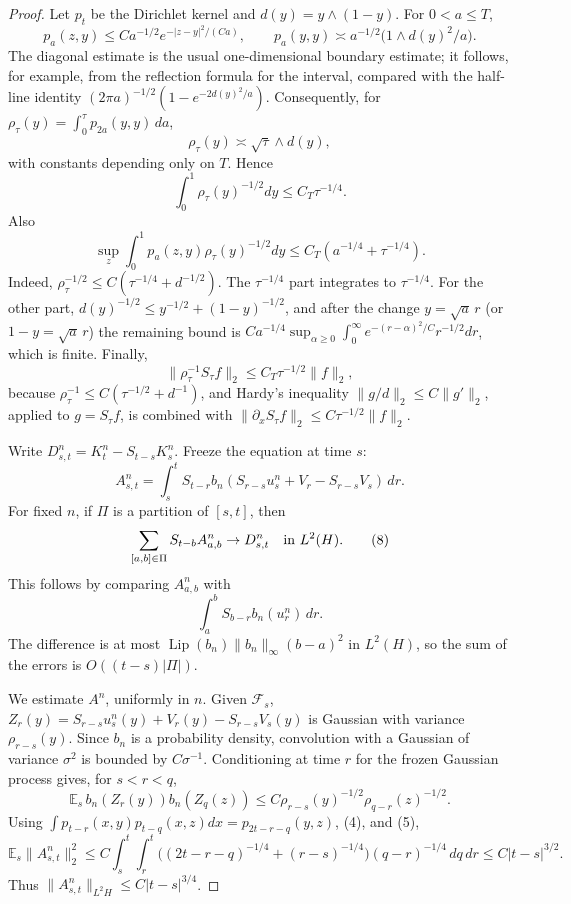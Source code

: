 \documentclass[12pt]{article}
\newcommand{\E}{\mathbb E}
\newcommand{\1}{\mathbf 1}
\newcommand{\calF}{\mathcal F}
\newcommand{\Lip}{\operatorname{Lip}}
\begin{document}
\begin{proof}
Let \(p_t\) be the Dirichlet kernel and \(d(y)=y\wedge(1-y)\).  For
\(0<a\le T\),
\[
p_a(z,y)\le Ca^{-1/2}e^{-|z-y|^2/(Ca)},\qquad
p_a(y,y)\asymp a^{-1/2}\bigl(1\wedge d(y)^2/a\bigr).
\]
The diagonal estimate is the usual one-dimensional boundary estimate; it
follows, for example, from the reflection formula for the interval, compared
with the half-line identity
\((2\pi a)^{-1/2}(1-e^{-2d(y)^2/a})\).  Consequently, for
\(\rho_\tau(y)=\int_0^\tau p_{2a}(y,y)\,da\),
\[
        \rho_\tau(y)\asymp \sqrt{\tau}\wedge d(y),             \tag{3}
\]
with constants depending only on \(T\).  Hence
\[
 \int_0^1\rho_\tau(y)^{-1/2}dy\le C_T\tau^{-1/4}.              \tag{4}
\]
Also
\[
 \sup_z\int_0^1p_a(z,y)\rho_\tau(y)^{-1/2}dy
 \le C_T(a^{-1/4}+\tau^{-1/4}).                              \tag{5}
\]
Indeed, \(\rho_\tau^{-1/2}\le C(\tau^{-1/4}+d^{-1/2})\).  The
\(\tau^{-1/4}\) part integrates to \(\tau^{-1/4}\).  For the other part,
\(d(y)^{-1/2}\le y^{-1/2}+(1-y)^{-1/2}\), and after the change
\(y=\sqrt a\,r\) (or \(1-y=\sqrt a\,r\)) the remaining bound is
\(Ca^{-1/4}\sup_{\alpha\ge0}\int_0^\infty e^{-(r-\alpha)^2/C}r^{-1/2}dr\),
which is finite.  Finally,
\[
        \|\rho_\tau^{-1}S_\tau f\|_2\le C_T\tau^{-1/2}\|f\|_2, \tag{6}
\]
because \(\rho_\tau^{-1}\le C(\tau^{-1/2}+d^{-1})\), and Hardy's inequality
\(\|g/d\|_2\le C\|g'\|_2\), applied to \(g=S_\tau f\), is combined with
\(\|\partial_xS_\tau f\|_2\le C\tau^{-1/2}\|f\|_2\).

Write \(D^n_{s,t}=K_t^n-S_{t-s}K_s^n\).  Freeze the equation at time \(s\):
\[
 A^n_{s,t}=\int_s^tS_{t-r}
 b_n\!\left(S_{r-s}u_s^n+V_r-S_{r-s}V_s\right)\,dr .          \tag{7}
\]
For fixed \(n\), if \(\Pi\) is a partition of \([s,t]\), then
\[
 \sum_{[a,b]\in\Pi}S_{t-b}A^n_{a,b}\to D^n_{s,t}\quad\hbox{in }L^2(H).
 \tag{8}
\]
This follows by comparing \(A^n_{a,b}\) with
\[
        \int_a^bS_{b-r}b_n(u_r^n)\,dr .
\]
The difference is at most
\(\Lip(b_n)\|b_n\|_\infty(b-a)^2\) in \(L^2(H)\), so the sum of the errors is
\(O((t-s)|\Pi|)\).

We estimate \(A^n\), uniformly in \(n\).  Given \(\calF_s\),
\(Z_r(y)=S_{r-s}u_s^n(y)+V_r(y)-S_{r-s}V_s(y)\) is Gaussian with variance
\(\rho_{r-s}(y)\).  Since \(b_n\) is a probability density, convolution with a
Gaussian of variance \(\sigma^2\) is bounded by \(C\sigma^{-1}\).  Conditioning
at time \(r\) for the frozen Gaussian process gives, for \(s<r<q\),
\[
 \E_s\,b_n(Z_r(y))b_n(Z_q(z))
 \le C\rho_{r-s}(y)^{-1/2}\rho_{q-r}(z)^{-1/2}.              \tag{9}
\]
Using \(\int p_{t-r}(x,y)p_{t-q}(x,z)dx=p_{2t-r-q}(y,z)\), (4), and (5),
\[
 \E_s\|A^n_{s,t}\|_2^2
 \le C\!\int_s^t\!\!\int_r^t
      \bigl((2t-r-q)^{-1/4}+(r-s)^{-1/4}\bigr)(q-r)^{-1/4}\,dq\,dr
 \le C|t-s|^{3/2}.                                          \tag{10}
\]
Thus \(\|A^n_{s,t}\|_{L^2H}\le C|t-s|^{3/4}\).


\end{proof}
\end{document}
